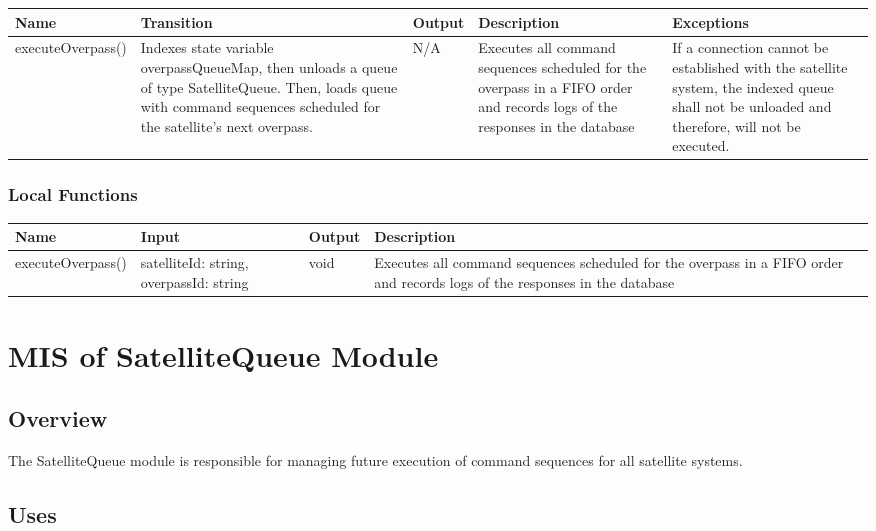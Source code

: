 \documentclass[12pt, titlepage]{article}
\begin{document}
\begin{center}
\begin{tabular}{|p{3.2cm} |p{3cm} | p{1.3cm} |p{5cm} |p{4cm}|}
\hline
\textbf{Name} & \textbf{Transition} & \textbf{Output} & \textbf{Description} & \textbf{Exceptions} \\
\hline
executeOverpass() & Indexes state variable overpassQueueMap, then unloads a queue of type SatelliteQueue. Then, loads queue with command sequences scheduled for the satellite’s next overpass. & N/A & Executes all command sequences scheduled for the overpass in a FIFO order and records logs of the responses in the database & If a connection cannot be established with the satellite system, the indexed queue shall not be unloaded and therefore, will not be executed. \\
\hline
\end{tabular}
\end{center}

\subsubsection{Local Functions}

\begin{center}
\begin{tabular}{|p{3.2cm} |p{3cm} | p{1.3cm} |p{5cm} |p{4cm}|}
\hline
\textbf{Name} & \textbf{Input} & \textbf{Output} & \textbf{Description} \\
\hline
executeOverpass() & satelliteId: string, overpassId: string & void & Executes all command sequences scheduled for the overpass in a FIFO order and records logs of the responses in the database \\
\hline
\end{tabular}
\end{center}


\section{MIS of {SatelliteQueue Module}} \label{Module} 

\subsection{Overview}

The SatelliteQueue module is responsible for managing future execution of command sequences for all satellite systems.

\subsection{Uses}
\end{document}
